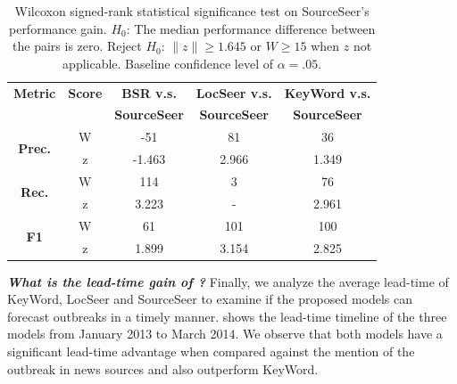 \documentclass[twoside,leqno,twocolumn]{article}
\newcommand{\fullmodel}{{{\sf SourceSeer}}\xspace}
\newcommand{\locationmodel}{{\sf LocSeer}\xspace}
\newcommand{\keymodel}{{\sf KeyWord}\xspace}
\begin{document}

\begin{table}
\scriptsize \centering
\captionsetup{font=scriptsize}
\caption{Wilcoxon signed-rank statistical significance test on \fullmodel's performance gain. $H_0$: The median performance difference between the pairs is zero. Reject $H_0$: $\|z\| \geq 1.645$ or $W \geq 15$ when $z$ not applicable. Baseline confidence level of $\alpha =.05$.}
\begin{tabular}{|c|c|c|c|c|} 
\hline
{\bf Metric} & {\bf Score} & {\bf BSR v.s.} & {\bf \locationmodel v.s.} & {\bf \keymodel v.s.} \\ 
             &             & {\bf \fullmodel}  & {\bf \fullmodel}       & {\bf \fullmodel} \\ \hline
\multirow{2}{*}{{\bf Prec.}} & W & -51 & 81 & 36\\
& z & -1.463 & 2.966 & 1.349\\ \hline
\multirow{2}{*}{{\bf Rec.}} & W & 114 & 3&76\\
& z & 3.223 & -&2.961\\ \hline
\multirow{2}{*}{{\bf F1}} & W & 61 & 101&100\\
& z & 1.899 & 3.154&2.825\\ \hline
\end{tabular}
\label{tab:significance}
\end{table}

\noindent\textbf{{\em What is the lead-time gain of {}?}} Finally, we analyze the average lead-time of \keymodel, \locationmodel and \fullmodel to examine if the proposed models can forecast outbreaks in a timely manner.  shows the lead-time timeline of the three models from January 2013 to March 2014. We observe that both models have a significant lead-time advantage when compared against  the mention of the outbreak in news sources and also outperform \keymodel.
\end{document}
